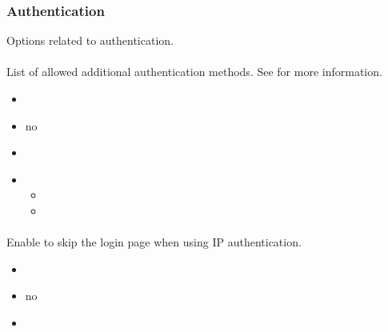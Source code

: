 \documentclass[a4paper,10pt,english,openany]{sphinxmanual}
\begin{document}
\subsubsection{Authentication}
\label{\detokenize{configuration-reference:authentication}}
\sphinxAtStartPar
Options related to authentication.


\paragraph{}
\label{\detokenize{configuration-reference:auth-methods}}
\sphinxAtStartPar
List of allowed additional authentication methods. See {\hyperref[\detokenize{config-advanced:authentication}]{}} for more information.
\begin{itemize}
\item {} 
\sphinxAtStartPar
{} 

\item {} 
\sphinxAtStartPar
{} no

\item {} 
\sphinxAtStartPar
{}

\begin{sphinxVerbatim}[commandchars=\\\{\}]
\end{sphinxVerbatim}

\item {} 
\sphinxAtStartPar
{}
\begin{itemize}
\item {} 
\sphinxAtStartPar
{}

\item {} 
\sphinxAtStartPar
{}

\end{itemize}

\end{itemize}


\paragraph{}
\label{\detokenize{configuration-reference:ip-autologin}}
\sphinxAtStartPar
Enable to skip the login page when using IP authentication.
\begin{itemize}
\item {} 
\sphinxAtStartPar
{} 

\item {} 
\sphinxAtStartPar
{} no

\item {} 
\sphinxAtStartPar
{} 

\end{itemize}
\end{document}
